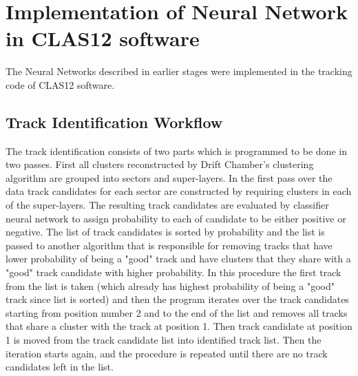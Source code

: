 \section{Implementation of Neural Network in CLAS12 software}

The Neural Networks described in earlier stages were implemented in the tracking code of CLAS12 
software. 


\subsection{Track Identification Workflow}

The track identification consists of two parts which is programmed to be done in two passes.
First all clusters reconstructed by Drift Chamber's clustering algorithm are grouped into sectors and super-layers.
In the first pass over the data track candidates for each sector are constructed by requiring clusters in each of the 
super-layers. The resulting track candidates are evaluated by classifier neural network to assign probability to each 
of candidate to be either positive or negative. The list of track candidates is sorted by probability and the list is passed
to another algorithm that is responsible for removing tracks that have lower probability of being a "good" track and have
clusters that they share with a "good" track candidate with higher probability. In this procedure the first track from 
the list is taken (which already has highest probability of being a "good" track since list is sorted) and then the program
iterates over the track candidates starting from position number 2 and to the end of the list and removes all tracks that share a 
cluster with the track at position 1. Then track candidate at position 1 is moved from the track candidate list into identified
track list. Then the iteration starts again, and the procedure is repeated until there are no track candidates left in the list.

